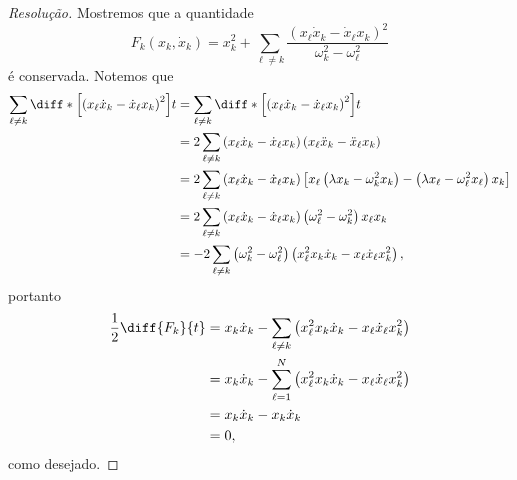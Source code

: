 \begin{proof}[Resolução]
    Mostremos que a quantidade
    \begin{equation*}
        F_k(x_k,\dot{x}_k) = x_k^2 + \sum_{\ell\neq k}\frac{\left(x_\ell \dot{x}_k - \dot{x}_\ell x_k\right)^2}{\omega_k^2 - \omega_\ell^2}
    \end{equation*}
    é conservada. Notemos que
    \begin{align*}
        \sum_{\ell \neq k}\diff*{\left[\left(x_\ell \dot{x}_k - \dot{x}_\ell x_k\right)^2\right]}{t}
        &= \sum_{\ell \neq k}\diff*{\left[\left(x_\ell \dot{x}_k - \dot{x}_\ell x_k\right)^2\right]}{t}\\
        &= 2 \sum_{\ell \neq k} \left(x_\ell\dot{x}_k - \dot{x}_\ell x_k\right)\left(x_\ell \ddot{x}_k - \ddot{x}_\ell x_k\right)\\
        &= 2 \sum_{\ell \neq k} \left(x_\ell\dot{x}_k - \dot{x}_\ell x_k\right)\left[x_\ell \left(\lambda x_k - \omega_k^2 x_k\right) - \left(\lambda x_\ell - \omega_\ell^2 x_\ell\right) x_k\right]\\
        &= 2 \sum_{\ell \neq k} \left(x_\ell\dot{x}_k - \dot{x}_\ell x_k\right)\left(\omega_\ell^2 - \omega_k^2\right)x_\ell x_k\\
        &= -2\sum_{\ell \neq k} \left(\omega_k^2 - \omega_\ell^2\right)\left(x_\ell^2 x_k \dot{x}_k - x_\ell \dot{x}_\ell x_k^2\right),
    \end{align*}
    portanto
    \begin{align*}
        \frac12\diff{F_k}{t} &= x_k \dot{x}_k - \sum_{\ell \neq k} \left(x_\ell^2 x_k\dot{x}_k - x_\ell \dot{x}_\ell x_k^2\right)\\
                             &= x_k \dot{x}_k  - \sum_{\ell = 1}^N \left(x_\ell^2 x_k\dot{x}_k - x_\ell \dot{x}_\ell x_k^2\right)\\
                             &= x_k \dot{x}_k - x_k \dot{x}_k\\
                             &= 0,
    \end{align*}
    como desejado.
\end{proof}

